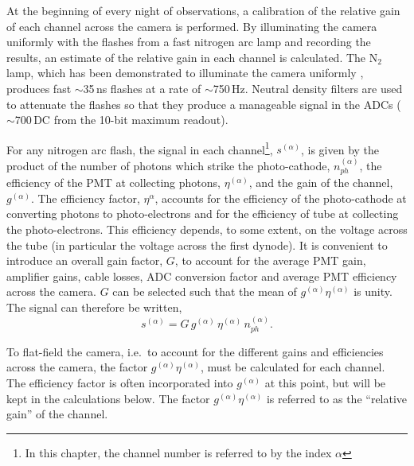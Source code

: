 At the beginning of every night of observations, a calibration of the
relative gain of each channel across the camera is performed. By
illuminating the camera uniformly with the flashes from a fast
nitrogen arc lamp and recording the results, an estimate of the
relative gain in each channel is calculated. The N$_2$ lamp, which has
been demonstrated to illuminate the camera uniformly
\citep{REF::SCHROEDTER::2002PRIVATE}, produces fast $\sim$35\,ns
flashes at a rate of $\sim$750\,Hz. Neutral density filters are used
to attenuate the flashes so that they produce a manageable signal in
the ADCs ($\sim$700\,DC from the 10-bit maximum readout).

For any nitrogen arc flash, the signal in each channel\footnote{In
this chapter, the channel number is referred to by the index
$\alpha$}, $s^{(\alpha)}$, is given by the product of the number of
photons which strike the photo-cathode, $n_{ph}^{(\alpha)}$, the
efficiency of the PMT at collecting photons, $\eta^{(\alpha)}$, and
the gain of the channel, $g^{(\alpha)}$. The efficiency factor,
$\eta^{\alpha}$, accounts for the efficiency of the photo-cathode at
converting photons to photo-electrons and for the efficiency of tube
at collecting the photo-electrons. This efficiency depends, to some
extent, on the voltage across the tube (in particular the voltage
across the first dynode). It is convenient to introduce an overall gain
factor, $G$, to account for the average PMT gain, amplifier gains,
cable losses, ADC conversion factor and average PMT efficiency across
the camera. $G$ can be selected such that the mean of
$g^{(\alpha)}\eta^{(\alpha)}$ is unity.  The signal can therefore be
written,
\[s^{(\alpha)} = G\,g^{(\alpha)}\,\eta^{(\alpha)}\,n_{ph}^{(\alpha)}.\]

To flat-field the camera, i.e.\ to account for the different gains and
efficiencies across the camera, the factor
$g^{(\alpha)}\eta^{(\alpha)}$, must be calculated for each
channel. The efficiency factor is often incorporated into
$g^{(\alpha)}$ at this point, but will be kept in the calculations
below. The factor $g^{(\alpha)}\eta^{(\alpha)}$ is referred to
as the ``relative gain'' of the channel.

